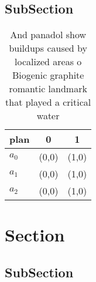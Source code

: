 \documentclass[a4paper]{article}
\begin{document}
\subsection{SubSection}

\begin{table}
\begin{adjustbox}{width=0.9\columnwidth}
\begin{tabular}{|l|l|l|}
\hline
\textbf{plan} & \multicolumn{1}{c|}{\textbf{0}} & \multicolumn{1}{c|}{\textbf{1}} \\ \hline
\textbf{$a_0$}  & (0,0) & (1,0) \\ \hline
\textbf{$a_1$}  & (0,0) & (1,0) \\ \hline
\textbf{$a_2$}  & (0,0) & (1,0) \\ \hline
\end{tabular}
\end{adjustbox}
\caption{And panadol show buildups caused by localized areas o Biogenic graphite romantic landmark that played a critical water 
}
\end{table}

\section{Section}

\subsection{SubSection}
\end{document}
